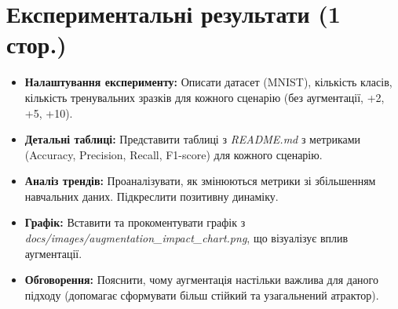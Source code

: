 \documentclass[12pt, a4paper]{article}
\begin{document}
\section{Експериментальні результати (1 стор.)}
\begin{itemize}
    \item \textbf{Налаштування експерименту:} Описати датасет (MNIST), кількість класів, кількість тренувальних зразків для кожного сценарію (без аугментації, +2, +5, +10).
    \item \textbf{Детальні таблиці:} Представити таблиці з \textit{README.md} з метриками (Accuracy, Precision, Recall, F1-score) для кожного сценарію.
    \item \textbf{Аналіз трендів:} Проаналізувати, як змінюються метрики зі збільшенням навчальних даних. Підкреслити позитивну динаміку.
    \item \textbf{Графік:} Вставити та прокоментувати графік з \textit{docs/images/augmentation\_impact\_chart.png}, що візуалізує вплив аугментації.
    \item \textbf{Обговорення:} Пояснити, чому аугментація настільки важлива для даного підходу (допомагає сформувати більш стійкий та узагальнений атрактор).
\end{itemize}
\end{document}
